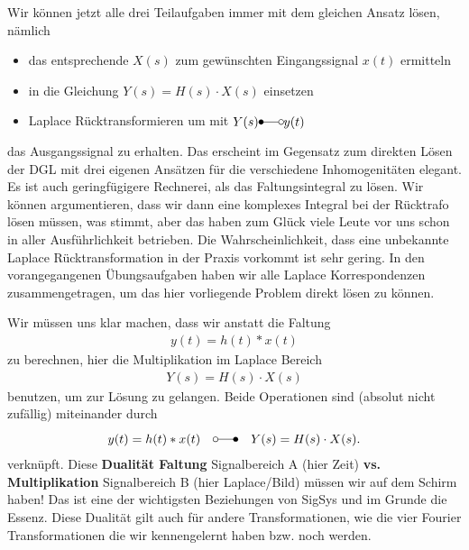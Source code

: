 \documentclass[11pt,a4paper,DIV=12]{scrartcl}
\numberwithin{equation}{section}
\numberwithin{figure}{section}
\begin{document}
\begin{ExCalc}
Wir können jetzt alle drei Teilaufgaben immer mit
dem gleichen Ansatz lösen, nämlich

\begin{itemize}
  \item das entsprechende $X(s)$ zum gewünschten
  Eingangssignal $x(t)$ ermitteln
  \item in die Gleichung $Y(s)=H(s) \cdot X(s)$ einsetzen
  \item Laplace Rücktransformieren um mit $Y(s) \Laplace y(t)$
\end{itemize}
das Ausgangssignal zu erhalten.
%
Das erscheint im Gegensatz zum direkten Lösen der DGL mit drei eigenen Ansätzen
für die verschiedene Inhomogenitäten elegant.
%
Es ist auch geringfügigere Rechnerei, als das Faltungsintegral zu lösen.
%
Wir können argumentieren, dass wir dann eine komplexes Integral bei der Rücktrafo
lösen müssen, was stimmt, aber das haben zum Glück viele Leute vor uns schon
in aller Ausführlichkeit betrieben. Die Wahrscheinlichkeit, dass eine
unbekannte Laplace Rücktransformation in der Praxis  vorkommt ist sehr gering.
%
In den vorangegangenen Übungsaufgaben haben wir alle Laplace Korrespondenzen
zusammengetragen, um das hier vorliegende Problem direkt lösen zu können.
%

Wir müssen uns klar machen, dass wir anstatt die Faltung
\begin{align}
y(t) = h(t) \ast x(t)
\end{align}
zu berechnen, hier die Multiplikation im Laplace Bereich
\begin{align}
Y(s) = H(s) \cdot X(s)
\end{align}
benutzen, um zur Lösung zu gelangen. Beide Operationen sind (absolut nicht zufällig)
miteinander durch
\begin{align}
\label{eq:4408E33353_duality}
y(t) = h(t) \ast x(t) \quad \laplace \quad Y(s) = H(s) \cdot X(s).
\end{align}
verknüpft. Diese \textbf{Dualität Faltung} Signalbereich A (hier Zeit)
\textbf{vs. Multiplikation} Signalbereich B (hier Laplace/Bild) müssen wir auf dem Schirm haben! Das ist
eine der wichtigsten Beziehungen von SigSys und im Grunde die Essenz.
Diese Dualität gilt auch für andere Transformationen, wie die vier Fourier
Transformationen die wir kennengelernt haben bzw. noch werden.
%





\end{ExCalc}
\end{document}
